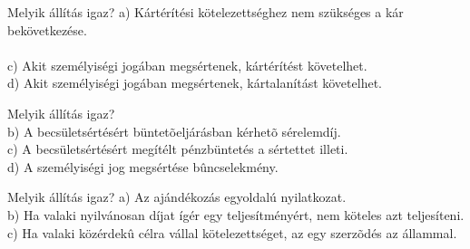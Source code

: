 \begin{frame}

\begin{tcolorbox}[title={134. Kérdés}]
Melyik állítás igaz?
\tcblower
a) Kártérítési kötelezettséghez nem szükséges a kár bekövetkezése.\\
\\
c) Akit személyiségi jogában megsértenek, kártérítést követelhet.\\
d) Akit személyiségi jogában megsértenek, kártalanítást követelhet. 
\end{tcolorbox}

\begin{tcolorbox}[title={135. Kérdés}]
Melyik állítás igaz?
\tcblower
{}\\
b) A becsületsértésért büntetõeljárásban kérhetõ sérelemdíj.\\
c) A becsületsértésért megítélt pénzbüntetés a sértettet illeti.\\
d) A személyiségi jog megsértése bûncselekmény.
\end{tcolorbox}

\begin{tcolorbox}[title={136. Kérdés}]
Melyik állítás igaz?
\tcblower
a) Az ajándékozás egyoldalú nyilatkozat.\\
b) Ha valaki nyilvánosan díjat ígér egy teljesítményért, nem köteles azt teljesíteni.\\
c) Ha valaki közérdekû célra vállal kötelezettséget, az egy szerzõdés az állammal.\\
\end{tcolorbox}

\end{frame}


